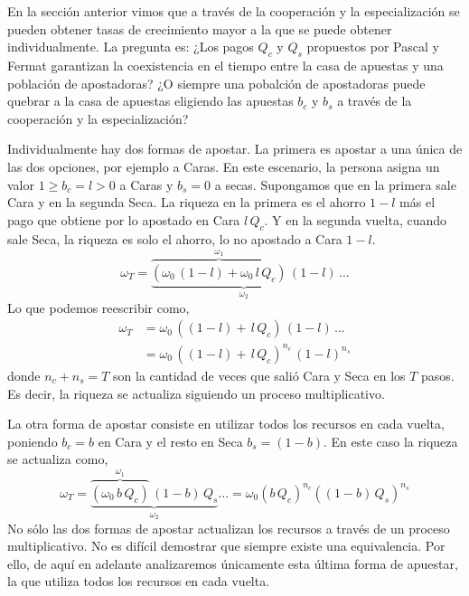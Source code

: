 \documentclass[a4paper,10pt]{book}
\theoremstyle{definition}
\begin{document}

En la sección anterior vimos que a través de la cooperación y la especialización se pueden obtener tasas de crecimiento mayor a la que se puede obtener individualmente.
%
La pregunta es: ¿Los pagos $Q_c$ y $Q_s$ propuestos por Pascal y Fermat garantizan la coexistencia en el tiempo entre la casa de apuestas y una población de apostadoras?
%
¿O siempre una pobalción de apostadoras puede quebrar a la casa de apuestas eligiendo las apuestas $b_c$ y $b_s$ a través de la cooperación y la especialización?


Individualmente hay dos formas de apostar.
%
La primera es apostar a una única de las dos opciones, por ejemplo a Caras.
%
En este escenario, la persona asigna un valor $ 1 \geq b_c = l > 0 $ a Caras y $b_s = 0$ a secas.
%
Supongamos que en la primera sale Cara y en la segunda Seca.
%
La riqueza en la primera es el ahorro $1-l$ más el pago que obtiene por lo apostado en Cara $l \, Q_c$.
%
Y en la segunda vuelta, cuando sale Seca, la riqueza es solo el ahorro, lo no apostado a Cara $1-l$.
%
\begin{equation}
\omega_T = \underbrace{\overbrace{(\omega_0 \, (1-l) + \omega_0 \, l \, Q_c )}^{\omega_1} \, (1-l)}_{\omega_2} \,\dots
\end{equation}
%
Lo que podemos reescribir como,
%
\begin{equation}
\begin{split}
\omega_T &= \omega_0 \, ((1-l) + \, l \, Q_c ) \, (1-l) \, \dots \\
 &= \omega_0 \, ( (1-l) + \, l \, Q_c )^{n_c} \, (1-l)^{n_s} 
\end{split}
\end{equation}
%
donde $n_c + n_s = T$ son la cantidad de veces que salió Cara y Seca en los $T$ pasos.
%
Es decir, la riqueza se actualiza siguiendo un proceso multiplicativo.


La otra forma de apostar consiste en utilizar todos los recursos en cada vuelta, poniendo $b_c = b$ en Cara y el resto en Seca $b_s = (1-b)$.
%
En este caso la riqueza se actualiza como,
%
\begin{equation} \label{eq:kelly_paraconsistente}
\omega_T = \underbrace{\overbrace{(\omega_0 \, b \, Q_c)}^{\omega_1} \,  (1-b) \, Q_s}_{\omega_2} \dots = \omega_0 (b \, Q_c)^{n_c} ((1-b) \, Q_s )^{n_s}
\end{equation}
%
No sólo las dos formas de apostar actualizan los recursos a través de un proceso multiplicativo. 
%
No es difícil demostrar que siempre existe una equivalencia.
%
Por ello, de aquí en adelante analizaremos únicamente esta última forma de apuestar, la que utiliza todos los recursos en cada vuelta.
\end{document}
